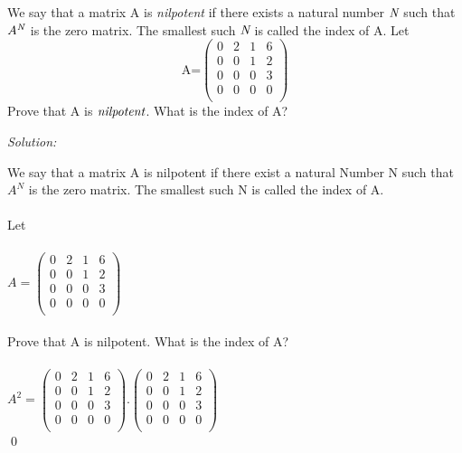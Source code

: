 \documentclass[12pt]{article}
\newenvironment{problem}[2][Problem]{\begin{trivlist}
\item[\hskip \labelsep {\bfseries #1}\hskip \labelsep {\bfseries #2.}]}{\end{trivlist}}
\newenvironment{sol}
    {\emph{Solution:}
    }
    {
    \qed
    }
\begin{document}
\begin{problem}{IX}
We say that a matrix A is {\emph {nilpotent}} if there exists a natural number ${\emph{N}}$ such that $A^{\emph{N}}$ is the zero matrix. The smallest such ${\emph{N}}$ is called the index of A. Let\\
$$\text{A=} \left(
\begin{array}{cccc}
 0 & 2 & 1 & 6 \\
 0 & 0 & 1 & 2 \\
 0 & 0 & 0 & 3 \\
 0 & 0 & 0 & 0 \\
\end{array}
\right)$$
Prove that A is ${\emph {nilpotent}}$. What is the index of A?
\end{problem}
\begin{sol}
We say that a matrix A is nilpotent if there exist a natural Number N such that $A^{N}$ is the zero matrix.  The smallest such N is called the index of A. \\ \\
Let\\ \\
$A=\left(\begin{array}{cccc}
 0 & 2 & 1 & 6 \\
 0 & 0 & 1 & 2 \\
 0 & 0 & 0 & 3 \\
 0 & 0 & 0 & 0 \\
\end{array}
\right)$ \\ \\
Prove that A is nilpotent. What is the index of A? \\ \\
$A^{2} = \left(
\begin{array}{cccc}
 0 & 2 & 1 & 6 \\
 0 & 0 & 1 & 2 \\
 0 & 0 & 0 & 3 \\
 0 & 0 & 0 & 0 \\
\end{array}
\right). \left(
\begin{array}{cccc}
 0 & 2 & 1 & 6 \\
 0 & 0 & 1 & 2 \\
 0 & 0 & 0 & 3 \\
 0 & 0 & 0 & 0 \\
\end{array}
\right)$\\


\end{sol}
\end{document}
